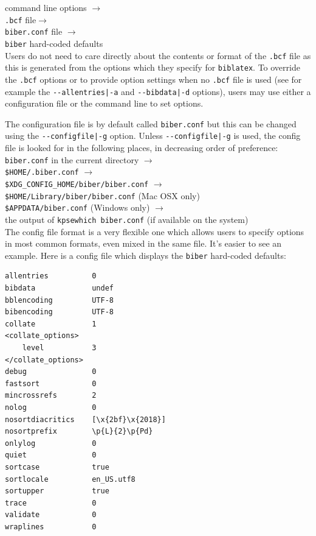 \documentclass{ltxdockit}
\begin{document}
\noindent command line options $\rightarrow$\\
\hspace*{1em}\verb+.bcf+ file$\rightarrow$\\
\hspace*{2em}\verb+biber.conf+ file $\rightarrow$\\
\hspace*{3em}\verb+biber+ hard-coded defaults\\[2ex]

\noindent Users do not need to care directly about the contents or format of the
\verb+.bcf+ file as this is generated from the options which they specify
for \verb+biblatex+. To override the \verb+.bcf+ options or to provide
option settings when no \verb+.bcf+ file is used (see for example the
\verb+--allentries|-a+ and \verb+--bibdata|-d+ options), users
may use either a configuration file or the command line to set options.

The configuration file is by default called \verb+biber.conf+ but this can
be changed using the \verb+--configfile|-g+ option. Unless
\verb+--configfile|-g+ is used, the config file is
looked for in the following places, in decreasing order of preference:\\[2ex]

\noindent \verb+biber.conf+ in the current directory $\rightarrow$\\
\hspace*{1em}\verb+$HOME/.biber.conf+ $\rightarrow$\\
\hspace*{2em}\verb+$XDG_CONFIG_HOME/biber/biber.conf+ $\rightarrow$\\
\hspace*{3em}\verb+$HOME/Library/biber/biber.conf+ (Mac OSX only)\\
\hspace*{3em}\verb+$APPDATA/biber.conf+ (Windows only) $\rightarrow$\\
\hspace*{4em}the output of \verb+kpsewhich biber.conf+ (if available on the
system)\\[2ex]

\noindent The config file format is a very flexible one which allows users to specify
options in most common formats, even mixed in the same file. It's easier to
see an example. Here is a config file which displays the \verb+biber+
hard-coded defaults:

\begin{verbatim}
allentries          0
bibdata             undef 
bblencoding         UTF-8
bibencoding         UTF-8
collate             1
<collate_options>
    level           3
</collate_options>
debug               0
fastsort            0
mincrossrefs        2
nolog               0
nosortdiacritics    [\x{2bf}\x{2018}]
nosortprefix        \p{L}{2}\p{Pd}
onlylog             0
quiet               0
sortcase            true
sortlocale          en_US.utf8
sortupper           true
trace               0
validate            0
wraplines           0
\end{verbatim}
\end{document}
